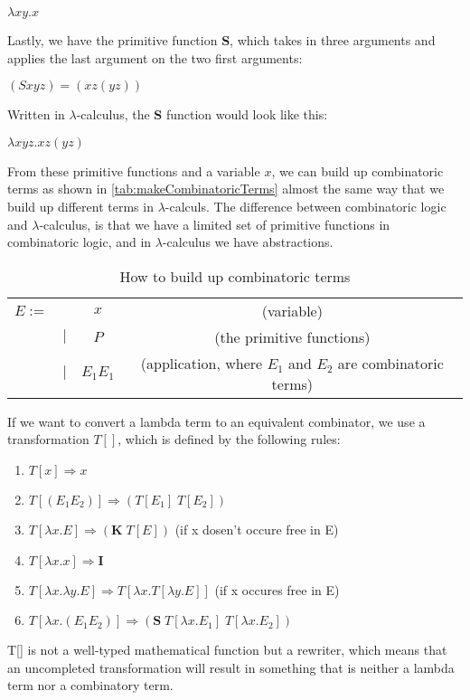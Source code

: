 \begin{center}
    $\lambda xy.x$\\    
\end{center}
Lastly, we have the primitive function \textbf{S}, which takes in three arguments and applies the last argument on the two first arguments:
\begin{center}
    $ (S x y z) = (x z (y z))$\\    
\end{center}
Written in $\lambda$-calculus, the \textbf{S} function would look like this:\\
\begin{center}
    $\lambda xyz.xz(yz)$\\    
\end{center}
From these primitive functions and a variable $x$, we can build up combinatoric terms as shown in \autoref{tab:makeCombinatoricTerms} almost the same way that we build up different terms in $\lambda$-calculs. The difference between combinatoric logic and $\lambda$-calculus, is that we have a limited set of primitive functions in combinatoric logic, and in $\lambda$-calculus we have abstractions.

\begin{table}[]
    \centering
    \begin{tabular}{c c c | c}
         $E :=$&  & $x$ & (variable)\\
         & $|$ & $P$ & (the primitive functions) \\
         & $|$ & $E_1 E_1$ & (application, where $E_1$ and $E_2$ are combinatoric terms)\\
    \end{tabular}
    \caption{How to build up combinatoric terms}
    \label{tab:makeCombinatoricTerms}
\end{table}

\para
If we want to convert a lambda term to an equivalent combinator, we use a transformation $T[]$, which is defined by the following rules:
\begin{enumerate}
    \item $T[x] \Rightarrow x$
    \item $T[(E_1 E_2)] \Rightarrow (T[E_1]\; T[E_2])$
    \item $T[\lambda x.E] \Rightarrow (\textbf{K}\; T[E])$ (if x dosen't occure free in E)
    \item $T[\lambda x.x]\Rightarrow \textbf{I}$
    \item $T[\lambda x. \lambda y.E]\Rightarrow T[\lambda x.T[\lambda y.E]]$ (if x occures free in E)
    \item $T[\lambda x.(E_1 E_2)] \Rightarrow (\textbf{S} \; T[\lambda x.E_1] \; T[\lambda x.E_2])$
\end{enumerate}
T[] is not a well-typed mathematical function but a rewriter, which means that an uncompleted transformation will result in something that is neither a lambda term nor a combinatory term. 

